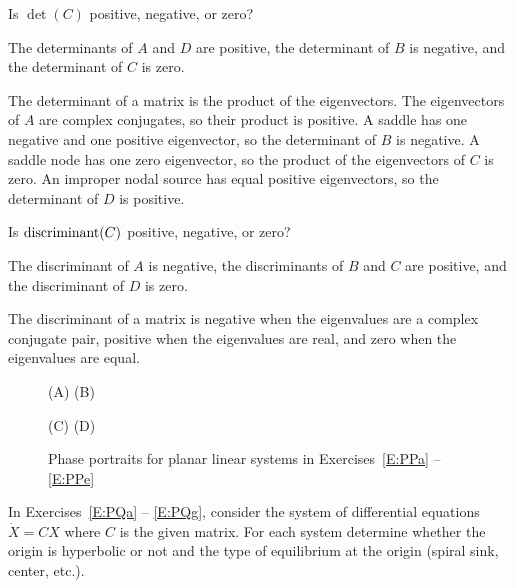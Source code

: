 \documentclass{ximera}
\begin{document}
\begin{exercise}  \label{E:PPd}
Is $\det(C)$ positive, negative, or zero?

\begin{solution}
\ans The determinants of $A$ and $D$ are positive, the
determinant of $B$ is negative, and the determinant of $C$ is zero.

\soln The determinant of a matrix is the product of the eigenvectors.  The
eigenvectors of $A$ are complex conjugates, so their product
is positive.  A saddle has one negative and one positive eigenvector, so
the determinant of $B$ is negative.  A saddle node has one zero
eigenvector, so the product of the eigenvectors of $C$ is zero.  An
improper nodal source has equal positive eigenvectors, so the determinant
of $D$ is positive.

\end{solution}
\end{exercise}
\begin{exercise}  \label{E:PPe}
Is ${\rm discriminant}(C)$ positive, negative, or zero?

\begin{solution}
\ans The discriminant of $A$ is negative, the discriminants of
$B$ and $C$ are positive, and the discriminant of $D$ is zero.

\soln The discriminant of a matrix is negative when the eigenvalues are
a complex conjugate pair, positive when the eigenvalues are real, and
zero when the eigenvalues are equal.

\end{solution}
\end{exercise}

\begin{figure*}[htb]
\centerline{(A) \hspace{2.7in} (B)}
           \centerline{%
           }
\centerline{(C) \hspace{2.7in} (D)}
           \centerline{%
           }
\caption{Phase portraits for planar linear systems in
Exercises~\protect\ref{E:PPa} -- \protect\ref{E:PPe}}
\label{F:PP}
\end{figure*}

\noindent In Exercises~\ref{E:PQa} -- \ref{E:PQg}, consider the system of
differential equations $\dot{X}=CX$ where $C$ is the given matrix.  For each
system determine whether the origin is hyperbolic or not and the type of
equilibrium at the origin (spiral sink, center, etc.).
\end{document}
